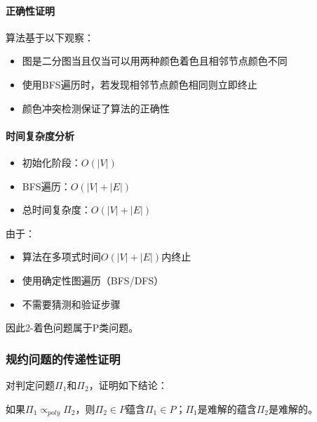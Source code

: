 \documentclass[./../main.tex]{subfiles}
\begin{document}
\paragraph{正确性证明}
算法基于以下观察：
\begin{itemize}
    \item 图是二分图当且仅当可以用两种颜色着色且相邻节点颜色不同
    \item 使用BFS遍历时，若发现相邻节点颜色相同则立即终止
    \item 颜色冲突检测保证了算法的正确性
\end{itemize}

\paragraph{时间复杂度分析}
\begin{itemize}
    \item 初始化阶段：$O(|V|)$
    \item BFS遍历：$O(|V|+|E|)$
    \item 总时间复杂度：$O(|V|+|E|)$
\end{itemize}

由于：
\begin{itemize}
    \item 算法在多项式时间$O(|V|+|E|)$内终止
    \item 使用确定性图遍历（BFS/DFS）
    \item 不需要猜测和验证步骤
\end{itemize}

因此2-着色问题属于P类问题。

\subsubsection{规约问题的传递性证明}
对判定问题$\Pi_1$和$\Pi_2$，证明如下结论：

如果$\Pi_1 \propto_{poly} \Pi_2$，则$\Pi_2 \in P$蕴含$\Pi_1 \in P$；$\Pi_1$是难解的蕴含$\Pi_2$是难解的。
\end{document}
